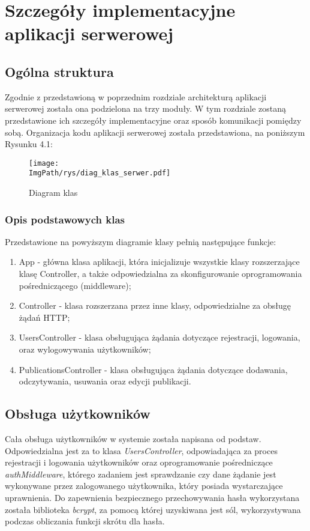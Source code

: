 \documentclass[a4paper,12pt,twoside,openany]{report}
\newcommand{\ImgPath}{.}
\begin{document}
\chapter{Szczegóły implementacyjne aplikacji serwerowej}
\section{Ogólna struktura}
Zgodnie z przedstawioną w poprzednim rozdziale architekturą aplikacji serwerowej została ona podzielona na trzy moduły. W tym rozdziale zostaną przedstawione ich szczegóły implementacyjne oraz sposób komunikacji pomiędzy sobą. Organizacja kodu aplikacji serwerowej została przedstawiona, na poniższym Rysunku 4.1:

 \begin{figure}[!htbp]
	\begin{center}
		\centering
		\texttt{[image: \\ImgPath/rys/diag\_klas\_serwer.pdf]}
	\end{center}
	\caption{Diagram klas}
	\label{diagramKlas}
\end{figure}
\subsection{Opis podstawowych klas}
Przedstawione na powyższym diagramie klasy pełnią następujące funkcje:
\begin{enumerate}
	\item App - główna klasa aplikacji, która inicjalizuje wszystkie klasy rozszerzające klasę Controller, a także odpowiedzialna za skonfigurowanie oprogramowania pośredniczącego (middleware);
	
	\item Controller - klasa rozszerzana przez inne klasy, odpowiedzialne za obsługę żądań  HTTP;
	
	\item UsersController - klasa obsługująca żądania dotyczące rejestracji, logowania, oraz wylogowywania użytkowników;
	
	\item PublicationsController - klasa obsługująca żądania dotyczące dodawania, odczytywania, usuwania oraz edycji publikacji.
	
\end{enumerate}

\section{Obsługa użytkowników}
Cała obsługa użytkowników w systemie została napisana od podstaw. Odpowiedzialna jest za to klasa \textit{UsersController}, odpowiadająca za proces rejestracji i logowania użytkowników oraz oprogramowanie pośredniczące \textit{authMiddleware}, którego zadaniem jest sprawdzanie czy dane żądanie jest wykonywane przez zalogowanego użytkownika, który posiada wystarczające uprawnienia. Do zapewnienia bezpiecznego przechowywania hasła wykorzystana została biblioteka \textit{bcrypt}, za pomocą której uzyskiwana jest sól, wykorzystywana podczas obliczania funkcji skrótu dla hasła. 
\end{document}
